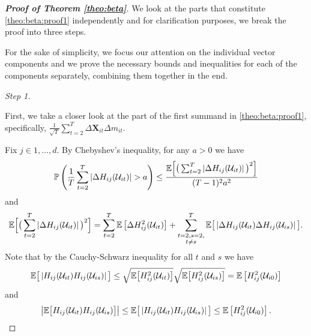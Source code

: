 \begin{proof}[\textnormal{\textbf{Proof of Theorem \ref{theo:beta}}}]
We look at the parts that constitute \eqref{theo:beta:proof1} independently and for clarification purposes, we break the proof into three steps.

For the sake of simplicity, we focus our attention on the individual vector components and we prove the necessary bounds and inequalities for each of the components separately, combining them together in the end.

{\it Step 1.}

First, we take a closer look at the part of the first summand in \eqref{theo:beta:proof1}, specifically, $\frac{1}{\sqrt{T}}\sum_{t=2}^T \Delta \mathbf{X}_{it} \Delta m_{it}$. 

Fix $j \in {1, \ldots, d}$. By Chebyshev's inequality, for any $a > 0$ we have
\begin{align}\label{theo-regs-proof-3}
\mathbb{P} \left(\frac{1}{T} \sum_{t=2}^T \left|\Delta  H_{ij} (\mathcal{U}_{it})\right| > a \right) \leq \frac{\mathbb{E} \Big[ \big(\sum_{t=2}^T \left|\Delta  H_{ij} (\mathcal{U}_{it})\right|\big)^2 \Big]}{(T-1)^2 a^2}
\end{align}
and 
\begin{align}\label{theo-regs-proof-4}
\begin{split}
\mathbb{E} \Big[ \big( \sum_{t=2}^T \left|\Delta  H_{ij} (\mathcal{U}_{it})\right|\big)^2 \Big] =  \sum_{t=2}^T \mathbb{E} \left[ \Delta  H^2_{ij} (\mathcal{U}_{it})  \right] + \sum_{\substack{{t=2}, s = 2,\\ t\neq s}}^T\mathbb{E} \big[ \left|\Delta  H_{ij} (\mathcal{U}_{it}) \Delta  H_{ij} (\mathcal{U}_{is})\right| \big].
\end{split}
\end{align}
Note that by the Cauchy-Schwarz inequality for all $t$ and $s$ we have
\begin{align}\label{theo:beta:proof5}
 \mathbb{E} \big[ \left| H_{ij}(\mathcal{U}_{it}) H_{ij}(\mathcal{U}_{is})\right| \big] \leq \sqrt{\mathbb{E}\big[ H^2_{ij}(\mathcal{U}_{it})\big]} \sqrt{ \mathbb{E} \big[H^2_{ij}(\mathcal{U}_{is})\big]} = \mathbb{E} \left[ H^2_{ij}(\mathcal{U}_{i0}) \right] 
\end{align}
and 
\begin{align*}
 \left|\mathbb{E} \big[ H_{ij}(\mathcal{U}_{it}) H_{ij}(\mathcal{U}_{is}) \big]\right|\leq \mathbb{E} \big[ \left| H_{ij}(\mathcal{U}_{it}) H_{ij}(\mathcal{U}_{is})\right| \big] \leq  \mathbb{E} \left[ H^2_{ij}(\mathcal{U}_{i0}) \right].
\end{align*}


\end{proof}
